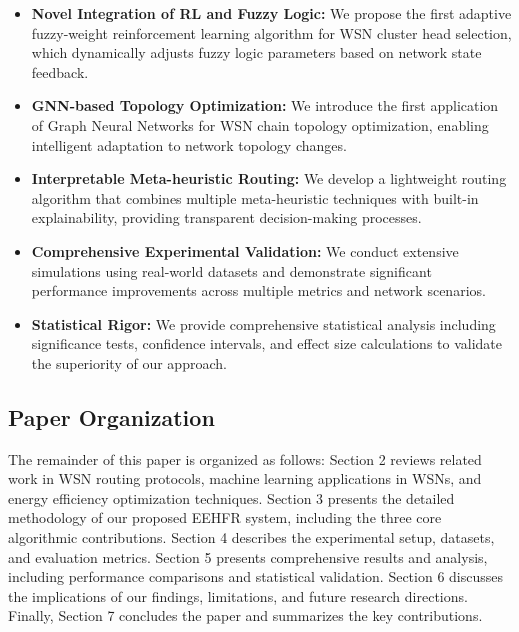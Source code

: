 \documentclass[conference]{IEEEtran}
\begin{document}
\begin{itemize}
    \item \textbf{Novel Integration of RL and Fuzzy Logic:} We propose the first adaptive fuzzy-weight reinforcement learning algorithm for WSN cluster head selection, which dynamically adjusts fuzzy logic parameters based on network state feedback.
    
    \item \textbf{GNN-based Topology Optimization:} We introduce the first application of Graph Neural Networks for WSN chain topology optimization, enabling intelligent adaptation to network topology changes.
    
    \item \textbf{Interpretable Meta-heuristic Routing:} We develop a lightweight routing algorithm that combines multiple meta-heuristic techniques with built-in explainability, providing transparent decision-making processes.
    
    \item \textbf{Comprehensive Experimental Validation:} We conduct extensive simulations using real-world datasets and demonstrate significant performance improvements across multiple metrics and network scenarios.
    
    \item \textbf{Statistical Rigor:} We provide comprehensive statistical analysis including significance tests, confidence intervals, and effect size calculations to validate the superiority of our approach.
\end{itemize}

\subsection{Paper Organization}

The remainder of this paper is organized as follows: Section 2 reviews related work in WSN routing protocols, machine learning applications in WSNs, and energy efficiency optimization techniques. Section 3 presents the detailed methodology of our proposed EEHFR system, including the three core algorithmic contributions. Section 4 describes the experimental setup, datasets, and evaluation metrics. Section 5 presents comprehensive results and analysis, including performance comparisons and statistical validation. Section 6 discusses the implications of our findings, limitations, and future research directions. Finally, Section 7 concludes the paper and summarizes the key contributions.
\end{document}
